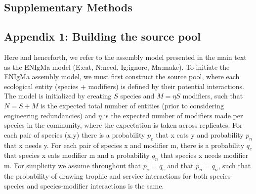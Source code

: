 \documentclass[twocolumn,preprintnumbers,amsmath,amssymb,superscriptaddress,linenumbers]{revtex4-1}
\newcommand{\rr}[1]{{\rm #1}}
\newcommand{\beginsupplement}{%
        \clearpage
        \setcounter{table}{0}
        \renewcommand{\thetable}{S\arabic{table}}%
        \setcounter{figure}{0}
        \renewcommand{\thefigure}{S\arabic{figure}}%
        \setcounter{equation}{0}
        \renewcommand{\theequation}{S\arabic{equation}}
     }
\begin{document}
\clearpage


\beginsupplement

\begin{bibunit}

\section*{Supplementary Methods}

% 

\subsection*{Appendix 1: Building the source pool}
Here and henceforth, we refer to the assembly model presented in the main text as the ENIgMa model (E:eat, N:need, Ig:ignore, Ma:make).
To initiate the ENIgMa assembly model, we must first construct the source pool, where each ecological entity (species + modifiers) is defined by their potential interactions.
The model is initialized by creating $S$ species and $M = \eta S$ modifiers, such that $N=S+M$ is the expected total number of entities (prior to considering engineering redundancies) and $\eta$ is the expected number of modifiers made per species in the community, where the expectation is taken across replicates.
For each pair of species (x,y) there is a probability $p_e$ that x eats y and probability $p_n$ that x needs y.
For each pair of species x and modifier m, there is a probability $q_e$ that species x eats modifier m and a probability $q_n$ that species x needs modifier m.
For simplicity we assume throughout that $p_e$ = $q_e$ and that $p_n = q_n$, such that the probability of drawing trophic and service interactions for both species-species and species-modifier interactions is the same.

\end{bibunit}
\end{document}

